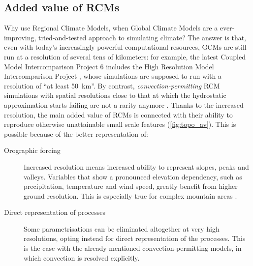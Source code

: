 \subsection{Added value of RCMs}
Why use Regional Climate Models, when Global Climate Models are a ever-improving, tried-and-tested approach to simulating climate?
The answer is that, even with today's increasingly powerful computational resources, GCMs are still run at a resolution of several tens of kilometers: for example, the latest Coupled Model Intercomparison Project 6 \citep[CMIP6,][]{Eyring2016} includes the High Resolution Model Intercomparison Project \citep[HighResMIP,][]{Haarsma2016}, whose simulations are supposed to run with a resolution of ``at least \SI{50}{\kilo \meter}''.
By contrast, \emph{convection-permitting} RCM simulations with spatial resolutions close to that at which the hydrostatic approximation starts failing \citep[about \SI{10}{\kilo \metre}][]{giorgi1999InttospesecRegclimodrev} are not a rarity anymore \citep[e.g.][]{Prein2015, Clark2016, Coppola2018}.
Thanks to the increased resolution, the main added value of RCMs is connected with their ability to reproduce otherwise unattainable small scale features (\cref{fig:topo_av}).
This is possible because of the better representation of:
\begin{description}
    \item[Orographic forcing] Increased resolution means increased ability to represent slopes, peaks and valleys. Variables that show a pronounced elevation dependency, such as precipitation, temperature and wind speed, greatly benefit from higher ground resolution. This is especially true for complex mountain areas \citep[see e.g.][]{Giorgi1989, Fischer2014}.
    \item[Direct representation of processes] Some parametrisations can be eliminated altogether at very high resolutions, opting instead for direct representation of the processes. This is the case with the already mentioned convection-permitting models, in which convection is resolved explicitly.
\end{description}
